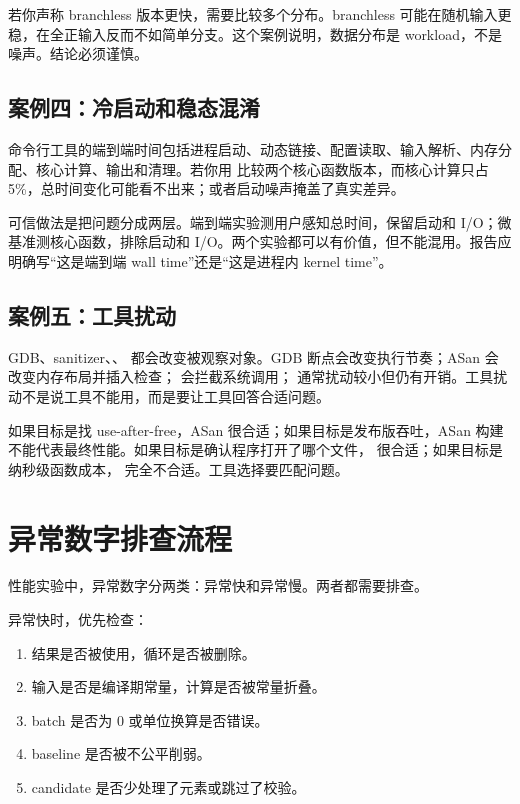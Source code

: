 若你声称 branchless 版本更快，需要比较多个分布。branchless 可能在随机输入更稳，在全正输入反而不如简单分支。这个案例说明，数据分布是 workload，不是噪声。结论必须谨慎。

\subsection{案例四：冷启动和稳态混淆}

命令行工具的端到端时间包括进程启动、动态链接、配置读取、输入解析、内存分配、核心计算、输出和清理。若你用  比较两个核心函数版本，而核心计算只占 5\%，总时间变化可能看不出来；或者启动噪声掩盖了真实差异。

可信做法是把问题分成两层。端到端实验测用户感知总时间，保留启动和 I/O；微基准测核心函数，排除启动和 I/O。两个实验都可以有价值，但不能混用。报告应明确写“这是端到端 wall time”还是“这是进程内 kernel time”。

\subsection{案例五：工具扰动}

GDB、sanitizer、、 都会改变被观察对象。GDB 断点会改变执行节奏；ASan 会改变内存布局并插入检查； 会拦截系统调用； 通常扰动较小但仍有开销。工具扰动不是说工具不能用，而是要让工具回答合适问题。

如果目标是找 use-after-free，ASan 很合适；如果目标是发布版吞吐，ASan 构建不能代表最终性能。如果目标是确认程序打开了哪个文件， 很合适；如果目标是纳秒级函数成本， 完全不合适。工具选择要匹配问题。

\section{异常数字排查流程}

性能实验中，异常数字分两类：异常快和异常慢。两者都需要排查。

异常快时，优先检查：

\begin{enumerate}
  \item 结果是否被使用，循环是否被删除。
  \item 输入是否是编译期常量，计算是否被常量折叠。
  \item batch 是否为 0 或单位换算是否错误。
  \item baseline 是否被不公平削弱。
  \item candidate 是否少处理了元素或跳过了校验。
\end{enumerate}

